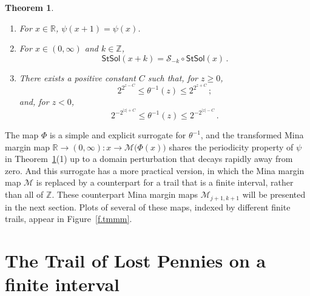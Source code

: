 \documentclass[letterpaper,11pt,oneside,reqno]{amsbook}
\newcommand{\N}{\ensuremath{\mathbb{N}}}
\newcommand{\R}{\ensuremath{\mathbb{R}}}
\newcommand{\Z}{\ensuremath{\mathbb{Z}}}
\newtheorem{theorem}{Theorem}[chapter]
\numberwithin{figure}{chapter}
\theoremstyle{definition}
\theoremstyle{definition}
\theoremstyle{definition}
\theoremstyle{definition}
\theoremstyle{definition}
\newcommand{\mc}{\mathcal}
\newcommand{\nwithoutzero}{\N_+}
\newcommand{\solution}{\mathsf{StSol}}
\newcommand{\minamm}{\mathcal{M}}
\newcommand{\PhiMac}{\Phi}
\begin{document}
\begin{theorem}\label{t.phithetainverse}
\leavevmode
\begin{enumerate}
\item For $x \in \R$, $\psi(x+1) = \psi(x)$. 
\item 
For $x \in (0,\infty)$ and $k \in \Z$, 
$$
\solution(x+k) = \mc{S}_{-k} \circ \solution (x) \, .
$$
\item There exists a positive constant $C$ such that, for $z \geq 0$,
$$
 2^{2^{z-C}} \leq  \theta^{-1}(z) \leq  2^{2^{z+C}} \, ;
$$
and, for $z < 0$,
$$
 2^{-2^{\vert z \vert +C}} \leq  \theta^{-1}(z) \leq  2^{-2^{\vert z \vert -C}} \, .
$$
\end{enumerate}
\end{theorem}
The map $\PhiMac$ is a simple and explicit surrogate for $\theta^{-1}$, and the transformed Mina margin map $\R \to (0,\infty): x \to \minamm\big(\PhiMac(x)\big)$
shares the periodicity property of $\psi$ in Theorem~\ref{t.phithetainverse}(1) up to a domain perturbation that decays rapidly away from zero. And this surrogate has a more practical version, in which the Mina margin map $\minamm$ is replaced by a counterpart for a trail that is a finite interval, rather than all of $\Z$. These counterpart Mina margin maps $\minamm_{j+1,k+1}$ will be presented in the next section. Plots of several of these maps, indexed by different finite trails, appear in Figure~\ref{f.tmmm}.


\section{The Trail of Lost Pennies on a finite interval}\label{s.finite}
\end{document}
